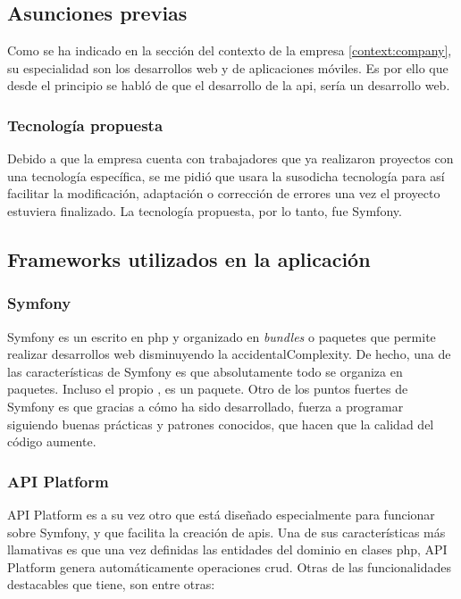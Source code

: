 \subsection{Asunciones previas}
Como se ha indicado en la sección del contexto de la empresa
\ref{context:company}, su especialidad son los desarrollos web y de
aplicaciones móviles. Es por ello que desde el principio se habló de que el
desarrollo de la \gls{api}, sería un desarrollo web.

\subsubsection{Tecnología propuesta}
Debido a que la empresa cuenta con trabajadores que ya realizaron proyectos con
una tecnología específica, se me pidió que usara la susodicha tecnología para
así facilitar la modificación, adaptación o corrección de errores una vez el
proyecto estuviera finalizado. La tecnología propuesta, por lo tanto, fue
Symfony.

\subsection{Frameworks utilizados en la aplicación}

\subsubsection{Symfony}
Symfony es un  escrito en \gls{php} y
organizado en \textit{bundles} o paquetes que permite realizar desarrollos web
disminuyendo la \gls{accidentalComplexity}. De hecho, una de las
características de Symfony es que absolutamente todo se organiza en paquetes.
Incluso el propio , es un paquete. Otro de los
puntos fuertes de Symfony es que gracias a cómo ha sido desarrollado, fuerza a
programar siguiendo buenas prácticas y patrones conocidos, que hacen que la
calidad del código aumente.

\subsubsection{API Platform}
\label{tech:apiplat}
API Platform es a su vez otro  que está
diseñado especialmente para funcionar sobre Symfony, y que facilita la creación
de \gls{api}s. Una de sus características más llamativas es que una vez
definidas las entidades del dominio en clases \gls{php}, API Platform genera
automáticamente operaciones \gls{crud}. Otras de las funcionalidades destacables
que tiene, son entre otras:

